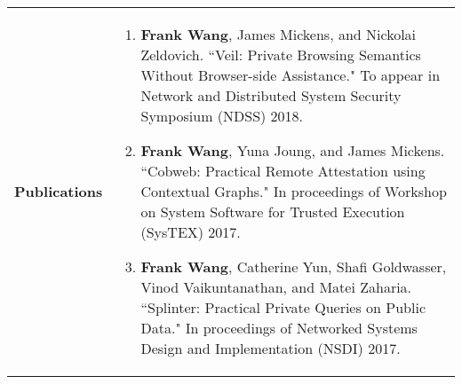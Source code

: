 \documentclass[a4paper,10pt]{article}
\begin{document}
\begin{longtable}{ p{0.9in} l }

\textbf{Publications} & \begin{minipage}[t]{0.78 \textwidth} 
\begin{enumerate}[leftmargin=*]
\setlength{\itemsep}{7pt}
                \setlength{\parskip}{0pt}
                \setlength{\parsep}{0pt}

\item{\textbf{Frank Wang}, James Mickens, and Nickolai Zeldovich. ``Veil: Private Browsing Semantics Without Browser-side Assistance." To appear in Network and Distributed System Security Symposium (NDSS) 2018.}

\item{\textbf{Frank Wang}, Yuna Joung, and James Mickens. ``Cobweb: Practical Remote Attestation using Contextual Graphs." In proceedings of Workshop on System Software for Trusted Execution (SysTEX) 2017.}

\item{\textbf{Frank Wang}, Catherine Yun, Shafi Goldwasser, Vinod Vaikuntanathan, and Matei Zaharia. ``Splinter: Practical Private Queries on Public Data." In proceedings of Networked Systems Design and Implementation (NSDI) 2017.}


\end{enumerate}
\end{minipage}
\end{longtable}
\end{document}
